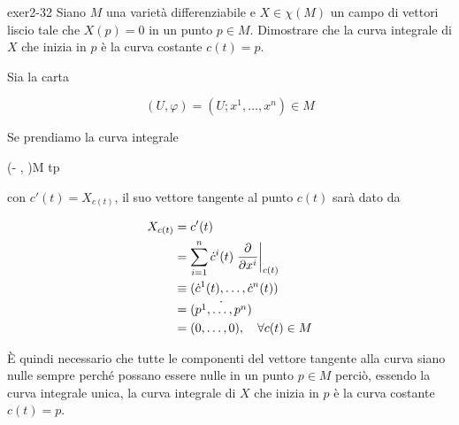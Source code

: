 
{exer2-32}
{
Siano $ M $ una varietà differenziabile e $ X \in \chi(M) $ un campo di vettori liscio tale che $ X(p) = 0 $ in un punto $ p \in M $. Dimostrare che la curva integrale di $ X $ che inizia in $ p $ è la curva costante $ c(t) = p $.
}
{
Sia la carta

\begin{equation}
	(U, \varphi) = (U; x^{1},\dots,x^{n}) \in M
\end{equation}

Se prendiamo la curva integrale

	{(- \varepsilon, \varepsilon)}{M}
	{t}{p}

con $ c'(t) = X_{c(t)} $, il suo vettore tangente al punto $ c(t) $ sarà dato da

\begin{align}
	\begin{split}
		X_{c(t)} &= c'(t) \\
		&= \sum_{i=1}^{n} \dot{c}^{i}(t) \eval{ \pdv{x^{i}} }_{c(t)} \\
		&\equiv (\dot{c}^{1}(t), \dots, \dot{c}^{n}(t)) \\
		&= \dot{(p^{1}, \dots, p^{n})} \\
		&= (0,\dots,0) \qcomma \forall c(t) \in M
	\end{split}
\end{align}

È quindi necessario che tutte le componenti del vettore tangente alla curva siano nulle sempre perché possano essere nulle in un punto $ p \in M $ perciò, essendo la curva integrale unica, la curva integrale di $ X $ che inizia in $ p $ è la curva costante $ c(t) = p $.
}


